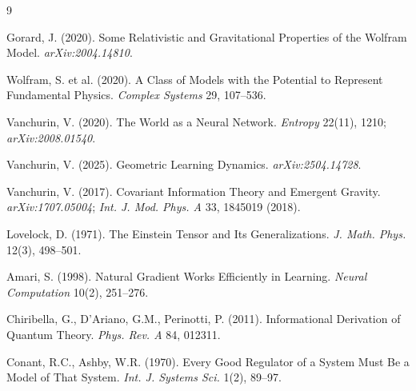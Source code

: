 \documentclass[11pt]{article}
\begin{document}
\begin{thebibliography}{9}

Gorard, J. (2020). Some Relativistic and Gravitational Properties of the Wolfram Model. \textit{arXiv:2004.14810}.

Wolfram, S. et al. (2020). A Class of Models with the Potential to Represent Fundamental Physics. \textit{Complex Systems} 29, 107--536.

Vanchurin, V. (2020). The World as a Neural Network. \textit{Entropy} 22(11), 1210; \textit{arXiv:2008.01540}.

Vanchurin, V. (2025). Geometric Learning Dynamics. \textit{arXiv:2504.14728}.

Vanchurin, V. (2017). Covariant Information Theory and Emergent Gravity. \textit{arXiv:1707.05004}; \textit{Int. J. Mod. Phys. A} 33, 1845019 (2018).

Lovelock, D. (1971). The Einstein Tensor and Its Generalizations. \textit{J. Math. Phys.} 12(3), 498--501.

Amari, S. (1998). Natural Gradient Works Efficiently in Learning. \textit{Neural Computation} 10(2), 251--276.

Chiribella, G., D'Ariano, G.M., Perinotti, P. (2011). Informational Derivation of Quantum Theory. \textit{Phys. Rev. A} 84, 012311.

Conant, R.C., Ashby, W.R. (1970). Every Good Regulator of a System Must Be a Model of That System. \textit{Int. J. Systems Sci.} 1(2), 89--97.

\end{thebibliography}
\end{document}
